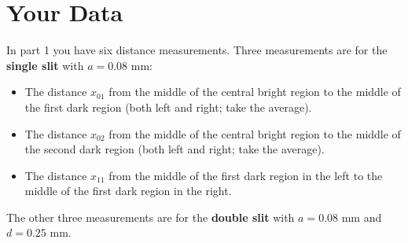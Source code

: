 \section{Your Data}
%
In part 1 you have six distance measurements. Three measurements are for the \textbf{single slit} with $a = 0.08$ mm:
\begin{itemize}
	\item The distance $x_{01}$ from the middle of the central bright region to the middle of the first dark region (both left and right; take the average).
	\item The distance $x_{02}$ from the middle of the central bright region to the middle of the second dark region (both left and right; take the average).
	\item The distance $x_{11}$ from the middle of the first dark region in the left to the middle of the first dark region in the right.
\end{itemize}
The other three measurements are for the \textbf{double slit} with $a = 0.08$ mm and $d = 0.25$ mm.

